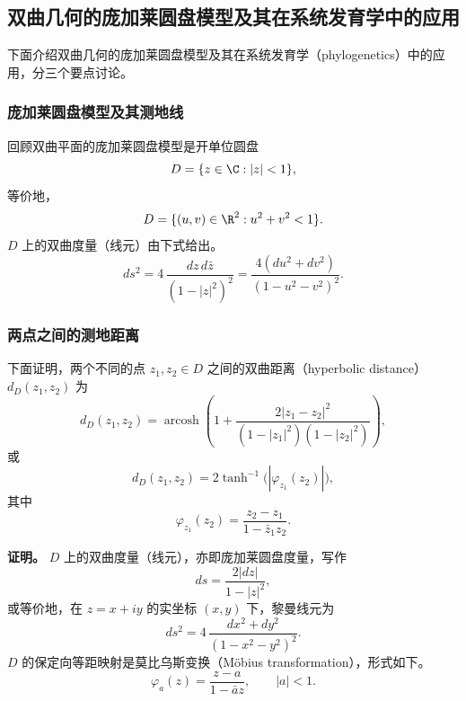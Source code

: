\subsection{双曲几何的庞加莱圆盘模型及其在系统发育学中的应用}
下面介绍双曲几何的庞加莱圆盘模型及其在系统发育学（phylogenetics）中的应用，分三个要点讨论。

\subsubsection{庞加莱圆盘模型及其测地线}
回顾双曲平面的庞加莱圆盘模型是开单位圆盘
\[
  D=\{z\in\C:|z|<1\},
\]
等价地，
\[
  D=\{(u,v)\in\R^2:u^2+v^2<1\}.
\]
$D$ 上的双曲度量（线元）由下式给出。
\begin{equation*}
  ds^2=4\,\frac{dz\,d\bar z}{(1-|z|^2)^2}
      =\frac{4(du^2+dv^2)}{(1-u^2-v^2)^2}.
  \tag{2.71}\label{eq:2.71}
\end{equation*}

\subsubsection{两点之间的测地距离}
下面证明，两个不同的点 $z_1,z_2\in D$ 之间的双曲距离（hyperbolic distance）$d_D(z_1,z_2)$ 为
\begin{equation*}
  d_D(z_1,z_2)=\operatorname{arcosh}\!\left(
    1+\frac{2|z_1-z_2|^2}{(1-|z_1|^2)(1-|z_2|^2)}\right),
  \tag{2.72}\label{eq:2.72}
\end{equation*}
或
\begin{equation*}
  d_D(z_1,z_2)=2\tanh^{-1}\!\bigl(|\varphi_{z_1}(z_2)|\bigr),
  \tag{2.73}\label{eq:2.73}
\end{equation*}
其中
\begin{equation*}
  \varphi_{z_1}(z_2)=\frac{z_2-z_1}{1-\bar z_1z_2}.
  \tag{2.74}\label{eq:2.74}
\end{equation*}

\textbf{证明。} $D$ 上的双曲度量（线元），亦即庞加莱圆盘度量，写作
\begin{equation*}
  ds=\frac{2|dz|}{1-|z|^2},
  \tag{2.75}\label{eq:2.75}
\end{equation*}
或等价地，在 $z=x+iy$ 的实坐标 $(x,y)$ 下，黎曼线元为
\begin{equation*}
  ds^2=4\,\frac{dx^2+dy^2}{(1-x^2-y^2)^2}.
  \tag{2.76}\label{eq:2.76}
\end{equation*}
$D$ 的保定向等距映射是莫比乌斯变换（Möbius transformation），形式如下。
\begin{equation*}
  \varphi_a(z)=\frac{z-a}{1-\bar a z},\qquad |a|<1.
  \tag{2.77}\label{eq:2.77}
\end{equation*}

